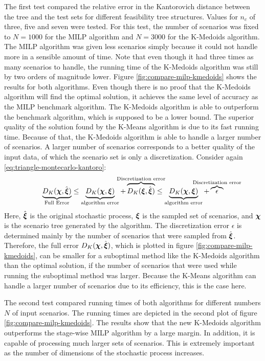 The first test compared the relative error in the Kantorovich distance between the tree and the test sets for different feasibility tree structures.
Values for $n_c$ of three, five and seven were tested.
For this test, the number of scenarios was fixed to $N=1000$ for the MILP algorithm and $N=3000$ for the K-Medoids algorithm.
The MILP algorithm was given less scenarios simply because it could not handle more in a sensible amount of time.
Note that even though it had three times as many scenarios to handle, the running time of the K-Medoids algorithm was still by two orders of magnitude lower.
Figure \ref{fig:compare-milp-kmedoids} shows the results for both algorithms.
Even though there is no proof that the K-Medoids algorithm will find the optimal solution, it achieves the same level of accuracy as the MILP benchmark algorithm.
The K-Medoids algorithm is able to outperform the benchmark algorithm, which is supposed to be a lower bound.
The superior quality of the solution found by the K-Means algorithm is due to its fast running time.
Because of that, the K-Medoids algorithm is able to handle a larger number of scenarios.
A larger number of scenarios corresponds to a better quality of the input data, of which the scenario set is only a discretization.
Consider again \eqref{eq:triangle-montecarlo-kantoro}:
\[\underbrace{D_K(\bs\chi,\hat{\bs\xi})}_{\text{Full Error}} \leq  \underbrace{D_K(\bs\chi, \bs\xi)}_{\text{algorithm error}} + \overbrace{D_K(\bs\xi,\hat{\bs\xi})}^{\mathclap{\text{Discretization error}}}\leq \underbrace{D_K(\bs\chi,\bs\xi)}_{\text{algorithm error}}+ \overbrace{\epsilon}^{\mathclap{\text{Discretization error}}}
\]
Here, $\hat{\boldsymbol\xi}$ is the original stochastic process, $\boldsymbol\xi$ is the sampled set of scenarios, and $\boldsymbol\chi$ is the scenario tree generated by the algorithm.
The discretization error $\epsilon$ is determined mainly by the number of scenarios that were sampled from $\hat{\boldsymbol\xi}$.
Therefore, the full error $D_K(\boldsymbol\chi,\hat{\boldsymbol\xi})$, which is plotted in figure \ref{fig:compare-milp-kmedoids}, can be smaller for a suboptimal method like the K-Medoids algorithm than the optimal solution, if the number of scenarios that were used while running the suboptimal method was larger.
Because the K-Means algorithm can handle a larger number of scenarios due to its efficiency, this is the case here.

The second test compared running times of both algorithms for different numbers $N$ of input scenarios.
The running times are depicted in the second plot of figure \ref{fig:compare-milp-kmedoids}.
The results show that the new K-Medoids algorithm outperforms the stage-wise MILP algorithm by a large margin.
In addition, it is capable of processing much larger sets of scenarios.
This is extremely important as the number of dimensions of the stochastic process increases.

